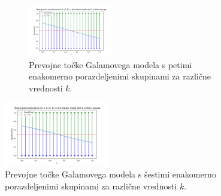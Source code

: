 \documentclass[a4paper,12pt]{article}
\begin{document}
\begin{figure}[ht!]
    \centering
    \begin{subfigure}
        \raggedleft
        \includegraphics[width=0.4\textwidth]{a515.png}
        \caption{Prevojne točke Galamovega modela s petimi enakomerno porazdeljenimi skupinami za različne vrednosti $k$.}
        \label{fig:a515}
    \end{subfigure}
    
    \begin{subfigure}
        \raggedright
        \includegraphics[width=0.4\textwidth]{a616.png}
        \caption{Prevojne točke Galamovega modela s šestimi enakomerno porazdeljenimi skupinami za različne vrednosti $k$.}
        \label{fig:a616}
    \end{subfigure}
\end{figure}





\printindex
\end{document}
